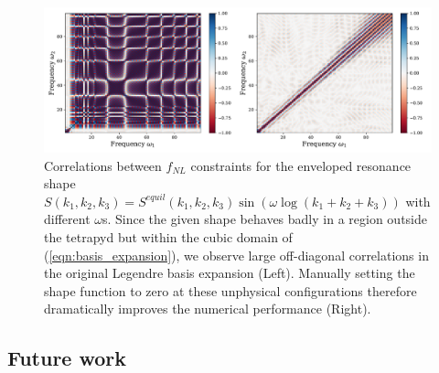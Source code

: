 \begin{figure}[htbp!] 
	\centering    
	\includegraphics[width=\textwidth]{sinlog_equil_template_correlations_compare_decomp.pdf}
	\caption{Correlations between $f_{NL}$ constraints for the enveloped resonance shape $S(k_1,k_2,k_3) = S^{equil}(k_1,k_2,k_3) \sin(\omega \log(k_1+k_2+k_3))$ with different $\omega$s. Since the given shape behaves badly in a region outside the tetrapyd but within the cubic domain of (\ref{eqn:basis_expansion}), we observe large off-diagonal correlations in the original Legendre basis expansion (Left). Manually setting the shape function to zero at these unphysical configurations therefore dramatically improves the numerical performance (Right). }
	\label{fig:sinlog_equil_template_decomp_comparison}
\end{figure}




\subsection{Future work}





%		
%		
%		
